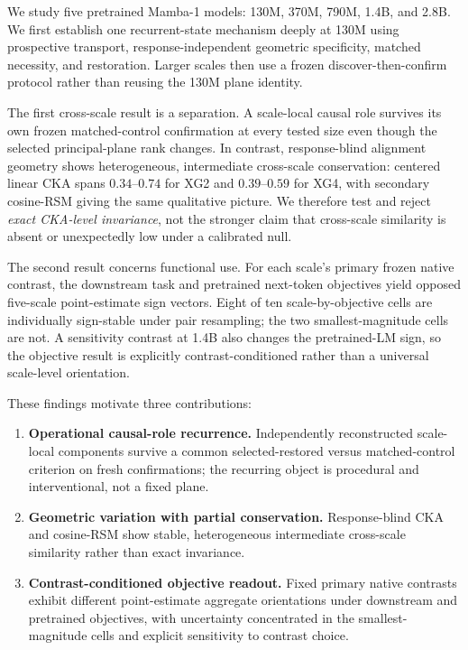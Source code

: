 \documentclass{article}
\begin{document}
We study five pretrained Mamba-1 models: 130M, 370M, 790M, 1.4B, and 2.8B. We first establish one recurrent-state mechanism deeply at 130M using prospective transport, response-independent geometric specificity, matched necessity, and restoration. Larger scales then use a frozen discover-then-confirm protocol rather than reusing the 130M plane identity.

The first cross-scale result is a separation. A scale-local causal role survives its own frozen matched-control confirmation at every tested size even though the selected principal-plane rank changes. In contrast, response-blind alignment geometry shows heterogeneous, intermediate cross-scale conservation: centered linear CKA spans $0.34$--$0.74$ for XG2 and $0.39$--$0.59$ for XG4, with secondary cosine-RSM giving the same qualitative picture. We therefore test and reject \emph{exact CKA-level invariance}, not the stronger claim that cross-scale similarity is absent or unexpectedly low under a calibrated null.

The second result concerns functional use. For each scale's primary frozen native contrast, the downstream task and pretrained next-token objectives yield opposed five-scale point-estimate sign vectors. Eight of ten scale-by-objective cells are individually sign-stable under pair resampling; the two smallest-magnitude cells are not. A sensitivity contrast at 1.4B also changes the pretrained-LM sign, so the objective result is explicitly contrast-conditioned rather than a universal scale-level orientation.

These findings motivate three contributions:
\begin{enumerate}
\item \textbf{Operational causal-role recurrence.} Independently reconstructed scale-local components survive a common selected-restored versus matched-control criterion on fresh confirmations; the recurring object is procedural and interventional, not a fixed plane.
\item \textbf{Geometric variation with partial conservation.} Response-blind CKA and cosine-RSM show stable, heterogeneous intermediate cross-scale similarity rather than exact invariance.
\item \textbf{Contrast-conditioned objective readout.} Fixed primary native contrasts exhibit different point-estimate aggregate orientations under downstream and pretrained objectives, with uncertainty concentrated in the smallest-magnitude cells and explicit sensitivity to contrast choice.
\end{enumerate}
\end{document}
